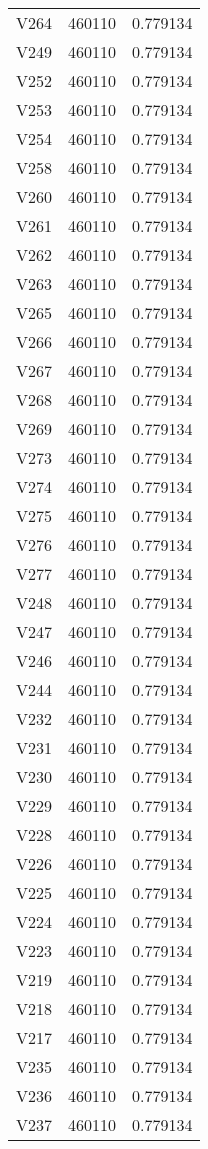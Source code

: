 \begin{tabular}{lrr}
V264 & 460110 & 0.779134 \\
V249 & 460110 & 0.779134 \\
V252 & 460110 & 0.779134 \\
V253 & 460110 & 0.779134 \\
V254 & 460110 & 0.779134 \\
V258 & 460110 & 0.779134 \\
V260 & 460110 & 0.779134 \\
V261 & 460110 & 0.779134 \\
V262 & 460110 & 0.779134 \\
V263 & 460110 & 0.779134 \\
V265 & 460110 & 0.779134 \\
V266 & 460110 & 0.779134 \\
V267 & 460110 & 0.779134 \\
V268 & 460110 & 0.779134 \\
V269 & 460110 & 0.779134 \\
V273 & 460110 & 0.779134 \\
V274 & 460110 & 0.779134 \\
V275 & 460110 & 0.779134 \\
V276 & 460110 & 0.779134 \\
V277 & 460110 & 0.779134 \\
V248 & 460110 & 0.779134 \\
V247 & 460110 & 0.779134 \\
V246 & 460110 & 0.779134 \\
V244 & 460110 & 0.779134 \\
V232 & 460110 & 0.779134 \\
V231 & 460110 & 0.779134 \\
V230 & 460110 & 0.779134 \\
V229 & 460110 & 0.779134 \\
V228 & 460110 & 0.779134 \\
V226 & 460110 & 0.779134 \\
V225 & 460110 & 0.779134 \\
V224 & 460110 & 0.779134 \\
V223 & 460110 & 0.779134 \\
V219 & 460110 & 0.779134 \\
V218 & 460110 & 0.779134 \\
V217 & 460110 & 0.779134 \\
V235 & 460110 & 0.779134 \\
V236 & 460110 & 0.779134 \\
V237 & 460110 & 0.779134 \\

\end{tabular}

